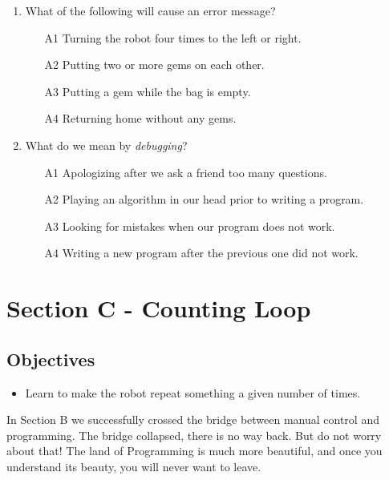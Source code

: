 {{\begin{enumerate}
\begin{enumerate}
\item[A1] Writing two commands on the same line.
\item[A2] Having two empty characters between commands.
\item[A3] Mis-spelling a command.  
\item[A4] Mistake that causes the robot to do something unexpected.
\end{enumerate}
\item What of the following will cause an error message?
\begin{enumerate}
\item[A1] Turning the robot four times to the left or right.
\item[A2] Putting two or more gems on each other.
\item[A3] Putting a gem while the bag is empty.
\item[A4] Returning home without any gems.
\end{enumerate}
\item What do we mean by {\em debugging}?
\begin{enumerate}
\item[A1] Apologizing after we ask a friend too many questions.
\item[A2] Playing an algorithm in our head prior to writing a program. 
\item[A3] Looking for mistakes when our program does not work.
\item[A4] Writing a new program after the previous one did not work.
\end{enumerate}
\end{enumerate}


\section{Section C - Counting Loop} \label{sec:repeat}

\subsection{Objectives} 

\begin{itemize}
\item Learn to make the robot repeat something a given number of times.
\end{itemize}

\noindent
In Section B we successfully crossed the bridge between manual control 
and programming. The bridge collapsed, there is no way back. But do 
not worry about that! The land of Programming is much more beautiful,
and once you understand its beauty, you will never want to leave.


}}
